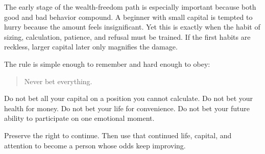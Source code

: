 The early stage of the wealth-freedom path is especially important because both good and bad behavior compound. A beginner with small capital is tempted to hurry because the amount feels insignificant. Yet this is exactly when the habit of sizing, calculation, patience, and refusal must be trained. If the first habits are reckless, larger capital later only magnifies the damage.

The rule is simple enough to remember and hard enough to obey:

\begin{quote}
Never bet everything.
\end{quote}

Do not bet all your capital on a position you cannot calculate. Do not bet your health for money. Do not bet your life for convenience. Do not bet your future ability to participate on one emotional moment.

Preserve the right to continue. Then use that continued life, capital, and attention to become a person whose odds keep improving.
